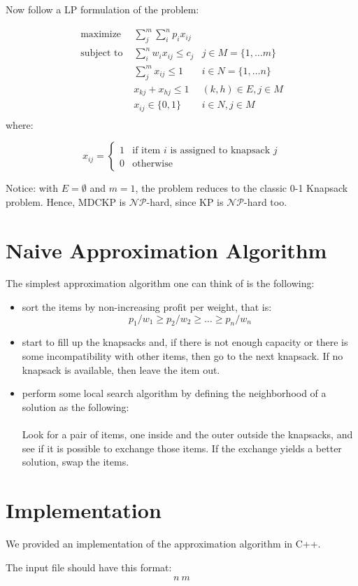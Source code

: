\documentclass[]{article}
\begin{document}
Now follow a LP formulation of the problem:

\begin{align*}
\text{maximize }   & \sum_j^m \sum_i^n p_i x_{ij} 	&\\
\text{subject to } & \sum_i^n w_i x_{ij} \le c_j 	& j \in M = \{1, \dots m\}\\
				   & \sum_j^m x_{ij} \le 1 			& i \in N = \{1, \dots n\}\\
				   & x_{kj} + x_{hj} \le 1			& (k, h)\in E, j\in M\\
				   & x_{ij} \in \{0, 1\} 			& i \in N, j \in M\\
\end{align*}
where:

\begin{equation*}
x_{ij} = \begin{cases}
	1 & \text{if item $i$ is assigned to knapsack $j$} \\
	0 & \text{otherwise}
\end{cases}
\end{equation*}

Notice: with $E=\emptyset$ and $m=1$, the problem reduces to the classic 0-1 Knapsack problem. Hence, MDCKP is $\mathcal{NP}$-hard, since KP is $\mathcal{NP}$-hard too.

\section{Naive Approximation Algorithm}
The simplest approximation algorithm one can think of is the following:
\begin{itemize}
	\item sort the items by non-increasing profit per weight, that is:
	\begin{equation*}
		p_1/w_1 \ge p_2/w_2 \ge \dots \ge p_n/w_n
	\end{equation*}
	\item start to fill up the knapsacks and, if there is not enough capacity or there is some incompatibility with other items, then go to the next knapsack. If no knapsack is available, then leave the item out.
	\item perform some local search algorithm by defining the neighborhood of a solution as the following:
	
	\paragraph{} Look for a pair of items, one inside and the outer outside the knapsacks, and see if it is possible to exchange those items. If the exchange yields a better solution, swap the items.
	
\end{itemize}

\section{Implementation}
We provided an implementation of the approximation algorithm in C++. 

The input file should have this format:
\begin{align}
&n\ m
&
\end{align}

\printbibliography
\end{document}
